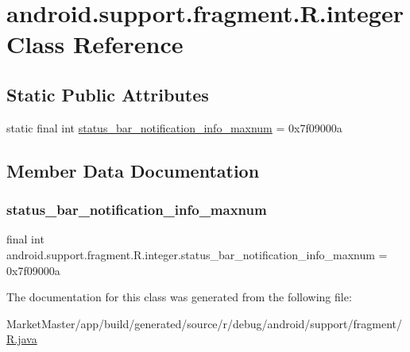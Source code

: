 \hypertarget{classandroid_1_1support_1_1fragment_1_1R_1_1integer}{}\section{android.\+support.\+fragment.\+R.\+integer Class Reference}
\label{classandroid_1_1support_1_1fragment_1_1R_1_1integer}
\subsection*{Static Public Attributes}
\begin{DoxyCompactItemize}
\item 
static final int \mbox{\hyperlink{classandroid_1_1support_1_1fragment_1_1R_1_1integer_ad45b5b452400c150732cf1ffbf992c84}{status\+\_\+bar\+\_\+notification\+\_\+info\+\_\+maxnum}} = 0x7f09000a
\end{DoxyCompactItemize}


\subsection{Member Data Documentation}
\mbox{\label{classandroid_1_1support_1_1fragment_1_1R_1_1integer_ad45b5b452400c150732cf1ffbf992c84}} 
\subsubsection{\texorpdfstring{status\+\_\+bar\+\_\+notification\+\_\+info\+\_\+maxnum}{status\_bar\_notification\_info\_maxnum}}
{\footnotesize\ttfamily final int android.\+support.\+fragment.\+R.\+integer.\+status\+\_\+bar\+\_\+notification\+\_\+info\+\_\+maxnum = 0x7f09000a\hspace{0.3cm}{\ttfamily [static]}}



The documentation for this class was generated from the following file\+:\begin{DoxyCompactItemize}
\item 
Market\+Master/app/build/generated/source/r/debug/android/support/fragment/\mbox{\hyperlink{debug_2android_2support_2fragment_2R_8java}{R.\+java}}\end{DoxyCompactItemize}
